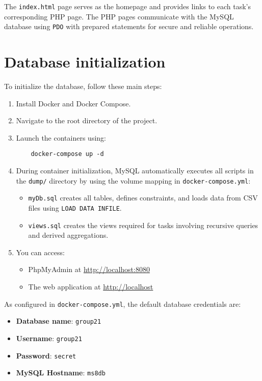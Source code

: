 \documentclass[a4paper, 12pt]{article}
\begin{document}
The \texttt{index.html} page serves as the homepage and provides links to each task's corresponding PHP page. The PHP pages communicate with the MySQL database using \texttt{PDO} with prepared statements for secure and reliable operations.

\section{Database initialization} \label{sec:2}

To initialize the database, follow these main steps:

\begin{enumerate}
    \item Install Docker and Docker Compose.
    \item Navigate to the root directory of the project.
    \item Launch the containers using:
    \begin{lstlisting}
    docker-compose up -d
    \end{lstlisting}
    
    \item During container initialization, MySQL automatically executes all scripts in the \texttt{dump/} directory by using the volume mapping in \texttt{docker-compose.yml}:
    \begin{itemize}
        \item \texttt{myDb.sql} creates all tables, defines constraints, and loads data from CSV files using \texttt{LOAD DATA INFILE}.
        \item \texttt{views.sql} creates the views required for tasks involving recursive queries and derived aggregations.
    \end{itemize}
    
    \item You can access:
    \begin{itemize}
        \item PhpMyAdmin at \url{http://localhost:8080}
        \item The web application at \url{http://localhost}
    \end{itemize}
\end{enumerate}

As configured in \texttt{docker-compose.yml}, the default database credentials are:
\begin{itemize}
    \item \textbf{Database name}: \texttt{group21}
    \item \textbf{Username}: \texttt{group21}
    \item \textbf{Password}: \texttt{secret}
    \item \textbf{MySQL Hostname}: \texttt{ms8db}
\end{itemize}
\end{document}
